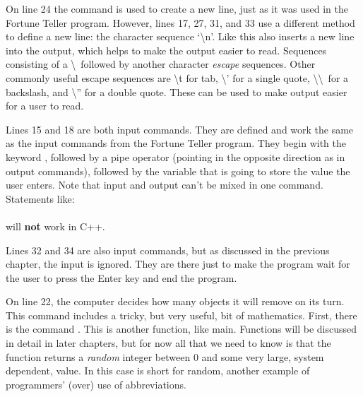 On line 24 the  command is used to create a new line, just as it was used in the Fortune Teller program.
However, lines 17, 27, 31, and 33 use a different method to define a new line: the character sequence `\textbackslash n'.  Like  this also inserts a new line into the output, which helps to make the output easier to read.  Sequences consisting of a \textbackslash~followed by another character \emph{escape} sequences.  Other commonly useful escape sequences are \textbackslash t for tab, \textbackslash ' for a single quote,  \textbackslash\textbackslash~for a backslash, and \textbackslash '' for a double quote.  These can be used to make output easier for a user to read.

Lines 15 and 18 are both input commands.  They are defined and work the same as the input commands from the Fortune Teller program.  They begin with the keyword , followed by a pipe operator (pointing in the opposite direction as in output commands), followed by the variable that is going to store the value the user enters.  Note that input and output can't be mixed in one command.  Statements like:\\
\\
will \textbf{not} work in C++.

Lines 32 and 34 are also input commands, but as discussed in the previous chapter, the input is ignored.   They are there just to make the program wait for the user to press the Enter key and end the program.

On line 22, the computer decides how many objects it will remove on its turn.  This command includes a tricky, but very useful, bit of mathematics.  First, there is the command .  This is another function, like main.  Functions will be discussed in detail in later chapters, but for now all that we need to know is that the 
 function returns a \emph{random} integer between 0 and some very large, system dependent, value.  In this case  is short for random, another example of programmers' (over) use of abbreviations.  


